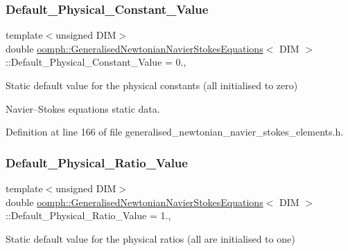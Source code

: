 \subsubsection{\texorpdfstring{Default\+\_\+\+Physical\+\_\+\+Constant\+\_\+\+Value}{Default\_Physical\_Constant\_Value}}
{\footnotesize\ttfamily template$<$unsigned D\+IM$>$ \\
double \hyperlink{classoomph_1_1GeneralisedNewtonianNavierStokesEquations}{oomph\+::\+Generalised\+Newtonian\+Navier\+Stokes\+Equations}$<$ D\+IM $>$\+::Default\+\_\+\+Physical\+\_\+\+Constant\+\_\+\+Value = 0.\hspace{0.3cm}{\ttfamily [static]}, {\ttfamily [private]}}



Static default value for the physical constants (all initialised to zero) 

Navier--Stokes equations static data. 

Definition at line 166 of file generalised\+\_\+newtonian\+\_\+navier\+\_\+stokes\+\_\+elements.\+h.

\mbox{\label{classoomph_1_1GeneralisedNewtonianNavierStokesEquations_a48efa8ee449c2595b65bf42fa7ecde23}} 
\subsubsection{\texorpdfstring{Default\+\_\+\+Physical\+\_\+\+Ratio\+\_\+\+Value}{Default\_Physical\_Ratio\_Value}}
{\footnotesize\ttfamily template$<$unsigned D\+IM$>$ \\
double \hyperlink{classoomph_1_1GeneralisedNewtonianNavierStokesEquations}{oomph\+::\+Generalised\+Newtonian\+Navier\+Stokes\+Equations}$<$ D\+IM $>$\+::Default\+\_\+\+Physical\+\_\+\+Ratio\+\_\+\+Value = 1.\hspace{0.3cm}{\ttfamily [static]}, {\ttfamily [private]}}



Static default value for the physical ratios (all are initialised to one) 

